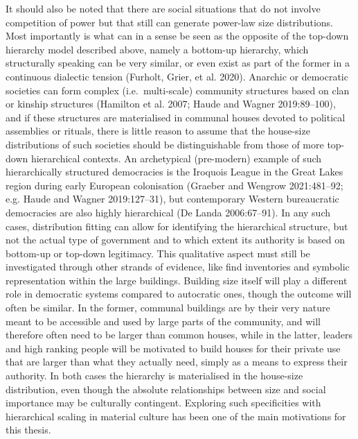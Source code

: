\documentclass[
  12pt,
]{book}
\begin{document}
It should also be noted that there are social situations that do not involve competition of power but that still can generate power-law size distributions. Most importantly is what can in a sense be seen as the opposite of the top-down hierarchy model described above, namely a bottom-up hierarchy, which structurally speaking can be very similar, or even exist as part of the former in a continuous dialectic tension (Furholt, Grier, et al. 2020). Anarchic or democratic societies can form complex (i.e.~multi-scale) community structures based on clan or kinship structures (Hamilton et al. 2007; Haude and Wagner 2019:89--100), and if these structures are materialised in communal houses devoted to political assemblies or rituals, there is little reason to assume that the house-size distributions of such societies should be distinguishable from those of more top-down hierarchical contexts. An archetypical (pre-modern) example of such hierarchically structured democracies is the Iroquois League in the Great Lakes region during early European colonisation (Graeber and Wengrow 2021:481--92; e.g. Haude and Wagner 2019:127--31), but contemporary Western bureaucratic democracies are also highly hierarchical (De Landa 2006:67--91). In any such cases, distribution fitting can allow for identifying the hierarchical structure, but not the actual type of government and to which extent its authority is based on bottom-up or top-down legitimacy. This qualitative aspect must still be investigated through other strands of evidence, like find inventories and symbolic representation within the large buildings. Building size itself will play a different role in democratic systems compared to autocratic ones, though the outcome will often be similar. In the former, communal buildings are by their very nature meant to be accessible and used by large parts of the community, and will therefore often need to be larger than common houses, while in the latter, leaders and high ranking people will be motivated to build houses for their private use that are larger than what they actually need, simply as a means to express their authority. In both cases the hierarchy is materialised in the house-size distribution, even though the absolute relationships between size and social importance may be culturally contingent. Exploring such specificities with hierarchical scaling in material culture has been one of the main motivations for this thesis.
\end{document}
